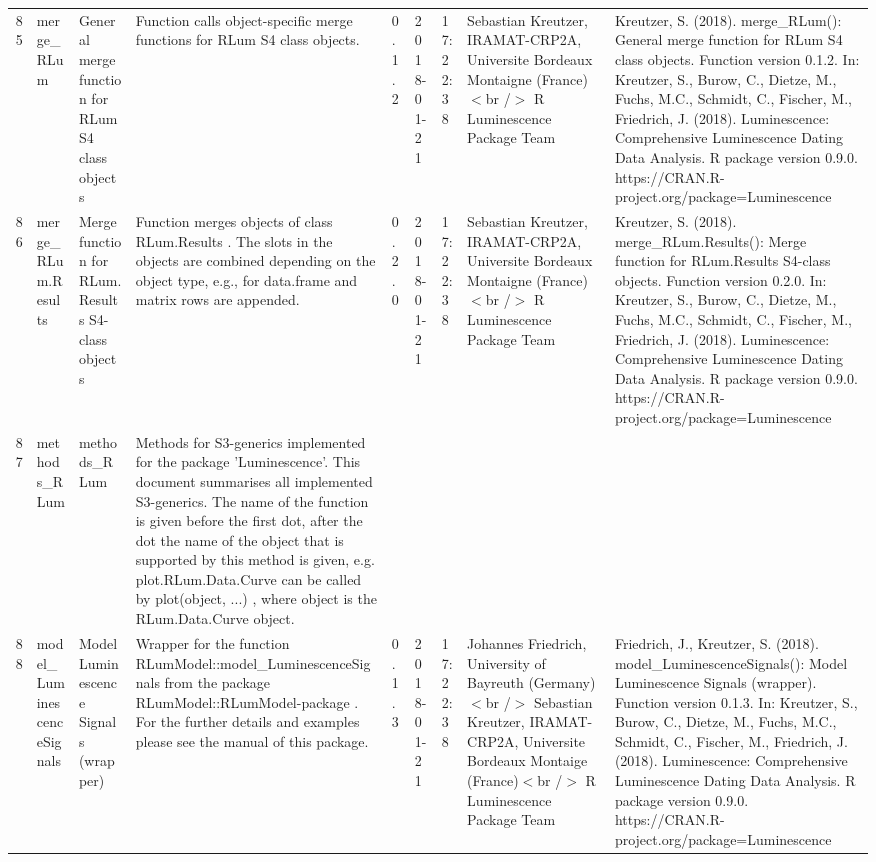 \begin{table}[ht]
\begin{tabular}{rllllllll}
 \\ 
  85 & merge\_RLum & General merge function for RLum S4 class objects & Function calls object-specific merge functions for RLum S4 class objects. & 0.1.2 & 2018-01-21 & 17:22:38
 & Sebastian Kreutzer, IRAMAT-CRP2A, Universite Bordeaux Montaigne (France)$<$br /$>$  R Luminescence Package Team & Kreutzer, S. (2018). merge\_RLum(): General merge function for RLum S4 class objects. Function version 0.1.2. In: Kreutzer, S., Burow, C., Dietze, M., Fuchs, M.C., Schmidt, C., Fischer, M., Friedrich, J. (2018). Luminescence: Comprehensive Luminescence Dating Data Analysis. R package version 0.9.0. https://CRAN.R-project.org/package=Luminescence
 \\ 
  86 & merge\_RLum.Results & Merge function for RLum.Results S4-class objects & Function merges objects of class  RLum.Results . The slots in the objects are combined depending on the object type, e.g., for  data.frame  and  matrix  rows are appended. & 0.2.0 & 2018-01-21 & 17:22:38
 & Sebastian Kreutzer, IRAMAT-CRP2A, Universite Bordeaux Montaigne (France)$<$br /$>$  R Luminescence Package Team & Kreutzer, S. (2018). merge\_RLum.Results(): Merge function for RLum.Results S4-class objects. Function version 0.2.0. In: Kreutzer, S., Burow, C., Dietze, M., Fuchs, M.C., Schmidt, C., Fischer, M., Friedrich, J. (2018). Luminescence: Comprehensive Luminescence Dating Data Analysis. R package version 0.9.0. https://CRAN.R-project.org/package=Luminescence
 \\ 
  87 & methods\_RLum & methods\_RLum & Methods for S3-generics implemented for the package 'Luminescence'. This document summarises all implemented S3-generics. The name of the function is given before the first dot, after the dot the name of the object that is supported by this method is given, e.g.  plot.RLum.Data.Curve  can be called by  plot(object, ...) , where  object  is the  RLum.Data.Curve  object. &  &  &  &  &  \\ 
  88 & model\_LuminescenceSignals & Model Luminescence Signals (wrapper) & Wrapper for the function  RLumModel::model\_LuminescenceSignals  from the package RLumModel::RLumModel-package . For the further details and examples please see the manual of this package. & 0.1.3 & 2018-01-21 & 17:22:38
 & Johannes Friedrich, University of Bayreuth (Germany)  $<$br /$>$ Sebastian Kreutzer, IRAMAT-CRP2A, Universite Bordeaux Montaige (France)$<$br /$>$  R Luminescence Package Team & Friedrich, J., Kreutzer, S. (2018). model\_LuminescenceSignals(): Model Luminescence Signals (wrapper). Function version 0.1.3. In: Kreutzer, S., Burow, C., Dietze, M., Fuchs, M.C., Schmidt, C., Fischer, M., Friedrich, J. (2018). Luminescence: Comprehensive Luminescence Dating Data Analysis. R package version 0.9.0. https://CRAN.R-project.org/package=Luminescence

\end{tabular}
\end{table}
